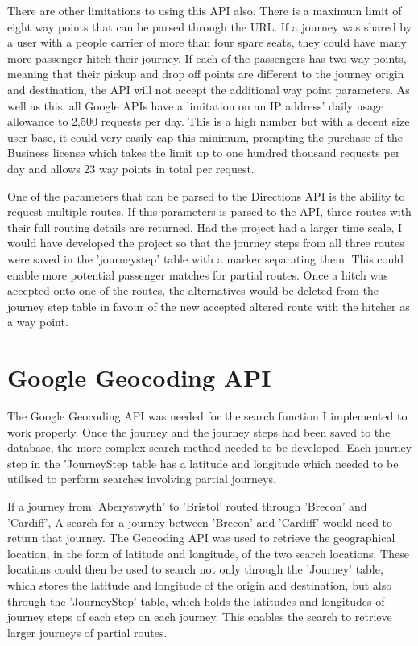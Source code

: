 	There are other limitations to using this API also. There is a maximum limit of eight way points that can be parsed through the URL. If a journey was shared by a user with a people carrier of more than four spare seats, they could have many more passenger hitch their journey. If each of the passengers has two way points, meaning that their pickup and drop off points are different to the journey origin and destination, the API will not accept the additional way point parameters. As well as this, all Google APIs have a limitation on an IP address' daily usage allowance to 2,500 requests per day. This is a high number but with a decent size user base, it could very easily cap this minimum, prompting the purchase of the Business license\cite{google_api_allowance} which takes the limit up to one hundred thousand requests per day and allows 23 way points in total per request.
	
	One of the parameters that can be parsed to the Directions API is the ability to request multiple routes. If this parameters is parsed to the API, three routes with their full routing details are returned. Had the project had a larger time scale, I would have developed the project so that the journey steps from all three routes were saved in the 'journey\textunderscore step' table with a marker separating them. This could enable more potential passenger matches for partial routes. Once a hitch was accepted onto one of the routes, the alternatives would be deleted from the journey step table in favour of the new accepted altered route with the hitcher as a way point.
	
\section{Google Geocoding API}
	The Google Geocoding API\cite{google_geocoding_api} was needed for the search function I implemented to work properly. Once the journey and the journey steps had been saved to the database, the more complex search method needed to be developed. Each journey step in the 'Journey\textunderscore Step table has a latitude and longitude which needed to be utilised to perform searches involving partial journeys. 
	
	If a journey from 'Aberystwyth' to 'Bristol' routed through 'Brecon' and 'Cardiff', A search for a journey between 'Brecon' and 'Cardiff' would need to return that journey. The Geocoding API was used to retrieve the geographical location, in the form of latitude and longitude, of the two search locations. These locations could then be used to search not only through the 'Journey' table, which stores the latitude and longitude of the origin and destination, but also through the 'Journey\textunderscore Step' table, which holds the latitudes and longitudes of journey steps of each step on each journey. This enables the search to retrieve larger journeys of partial routes.
	
